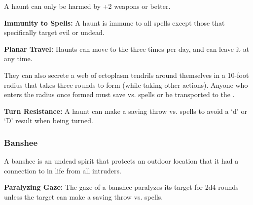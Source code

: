 \begin{multicols*}{2}
A haunt can only be harmed by +2 weapons or better.

\textbf{Immunity to Spells:} A haunt is immune to all spells except those that specifically target evil or undead.

\textbf{Planar Travel:} Haunts can move to the  three times per day, and can leave it at any time.

They can also secrete a web of ectoplasm tendrils around themselves in a 10-foot radius that takes three rounds to form (while taking other actions). Anyone who enters the radius once formed must save vs. spells or be transported to the .

\textbf{Turn Resistance:} A haunt can make a saving throw vs. spells to avoid a ‘d’ or ‘D’ result when being turned.

\subsubsection{Banshee}

A banshee is an undead spirit that protects an outdoor location that it had a connection to in life from all intruders.

\textbf{Paralyzing Gaze:} The gaze of a banshee paralyzes its target for 2d4 rounds unless the target can make a saving throw vs. spells.


\end{multicols*}
